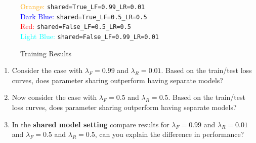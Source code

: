 \begin{figure}[ht]
{}%
    \caption{Training Results}
    \medskip
    \small
    \begin{center}
        \textcolor{orange}{Orange:} \texttt{shared=True\_LF=0.99\_LR=0.01}\\
        \textcolor{blue}{Dark Blue:} \texttt{shared=True\_LF=0.5\_LR=0.5}\\
        \textcolor{red}{Red:} \texttt{shared=False\_LF=0.5\_LR=0.5}\\
        \textcolor{cyan}{Light Blue:} \texttt{shared=False\_LF=0.99\_LR=0.01}
    \end{center}
\end{figure}


\begin{enumerate}
    \item {} Consider the case with $\lambda_F=0.99$ and $\lambda_R=0.01$. Based on the train/test loss curves, does parameter sharing outperform having separate models? 
    
    \item {} Now consider the case with $\lambda_F=0.5$ and $\lambda_R=0.5$.  Based on the train/test loss curves, does parameter sharing outperform having separate models? 
    
    \item {} In the \textbf{shared model setting} compare results for $\lambda_F=0.99$ and $\lambda_R=0.01$ and $\lambda_F=0.5$ and $\lambda_R=0.5$, can you explain the difference in performance?
\end{enumerate}